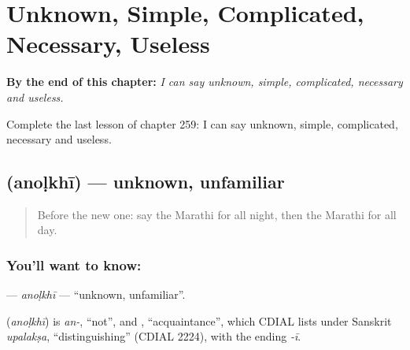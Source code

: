 
\chapter{Unknown, Simple, Complicated, Necessary, Useless}
\label{ch:mr-unknown-simple-complicated-necessary-useless}

\begin{chapteropening}
\textbf{By the end of this chapter:} \emph{I can say unknown, simple, complicated, necessary and useless.}

Complete the last lesson of chapter 259: I can say unknown, simple, complicated, necessary and useless.
\end{chapteropening}

\section[\texorpdfstring{\mr{अनोळखी} (anoḷkhī)}{अनोळखी (anoḷkhī)}]{ (anoḷkhī) — unknown, unfamiliar}

\label{lesson:MR-C259-anolkhi}



\begin{quote}
Before the new one: say the Marathi for all night, then the Marathi for all day.
\end{quote}

\subsection*{You'll want to know: }
\textbf{} — \emph{anoḷkhī} — \textquotedblleft{}unknown, unfamiliar\textquotedblright{}.

\begin{cousinweb}
\textbf{} (\emph{anoḷkhī}) is \emph{an-}, \textquotedblleft{}not\textquotedblright{}, and \textbf{}, \textquotedblleft{}acquaintance\textquotedblright{}, which CDIAL lists under Sanskrit \emph{upalakṣa}, \textquotedblleft{}distinguishing\textquotedblright{} (CDIAL 2224), with the ending \emph{-ī}.
\end{cousinweb}

